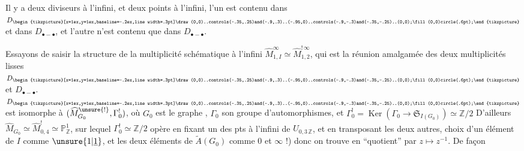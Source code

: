 Il y a deux diviseurs à l'infini,  et deux points  à l'infini,  l'un  est contenu dans $D_{\begin{tikzpicture}[x=1ex,y=1ex,baseline=-.2ex,line width=.3pt]\draw (0,0)..controls(-.35,.25)and(-.9,.3)..(-.95,0)..controls(-.9,-.3)and(-.35,-.25)..(0,0);\fill(0,0)circle(.6pt);\end{tikzpicture}}$ et dans $D_{\bullet-\bullet}$, et l'autre n'est contenu que dans $D_{\bullet-\bullet}$.

Essayons de  saisir la structure de la multiplicité schématique à l'infini $\widehat M^\infty_{1,I}\simeq\widehat M^{!\,\infty}_{1,2}$, qui est la réunion amalgamée des deux multiplicités lisses  $D_{\begin{tikzpicture}[x=1ex,y=1ex,baseline=-.2ex,line width=.3pt]\draw (0,0)..controls(-.35,.25)and(-.9,.3)..(-.95,0)..controls(-.9,-.3)and(-.35,-.25)..(0,0);\fill(0,0)circle(.6pt);\end{tikzpicture}}$ et $D_{\bullet-\bullet}$.
$D_{\begin{tikzpicture}[x=1ex,y=1ex,baseline=-.2ex,line width=.3pt]\draw (0,0)..controls(-.35,.25)and(-.9,.3)..(-.95,0)..controls(-.9,-.3)and(-.35,-.25)..(0,0);\fill(0,0)circle(.6pt);\end{tikzpicture}}$ est isomorphe à $(\widehat M^{\unsure{!}}_{G_0},\Gamma^!_0)$, où $G_0$ est le graphe
,
$\Gamma_0$ son groupe d'automorphismes, et $\Gamma^!_0=\operatorname{Ker}(\Gamma_0\longrightarrow\mathfrak S_{I(G_0)})\simeq\mathbb Z/2$
D'ailleurs $\widehat M_{G_0}\simeq\widehat M^!_{0,4}\simeq\mathbb P^1_{\mathbb Z}$, sur lequel $\Gamma^!_0\simeq\mathbb Z/2$ opère en fixant un des  pts à l'infini de $U_{0,3\,\mathbb Z}$,  et en transposant les deux autres,    choix d'un élément de $I$ comme $\unsure{1|\underline 1}$, et les deux éléments de $\widetilde A(G_0)$ comme $0$ et $\infty$ !) donc on trouve en ``quotient'' par $z\longmapsto z^{-1}$. De façon

